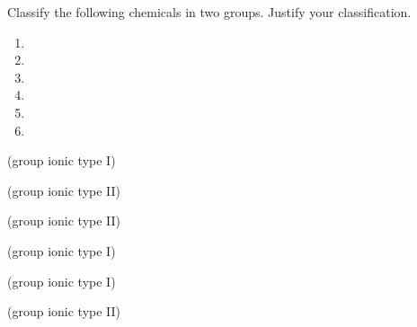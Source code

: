 \documentclass[main.tex]{subfiles}
\begin{document}
\begin{multicols*}{2}
\begin{question}[ID=\the\value{numA}]
Classify the following chemicals in two groups. Justify your classification.
\begin{multicols}{3}
  \noindent
  \begin{enumerate} [topsep=0pt, partopsep=0pt, label=(\alph*), leftmargin=.5cm]
\item {}  %
\item {} %
\item {} %
\item {} %
\item {} %
\item {} %
\end{enumerate}
\end{multicols}    
\end{question}
\begin{solution}
\begin{inparaenum}[(a)]
\item {}   (group ionic type I)
\item {}  (group ionic type II)
\item {}  (group ionic type II)
\item {}  (group ionic type I)
\item {}  (group ionic type I)
\item {}  (group ionic type II)
\end{inparaenum}\hspace{0.1cm}\end{solution}



\end{multicols*}
\end{document}
